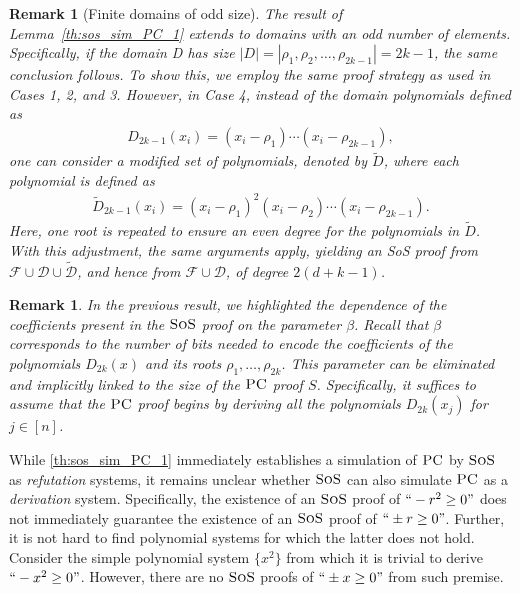 \documentclass[11pt]{article}
\newcommand{\sos}{\text{\sc{SoS}}}
\newcommand{\PC}{\textsc{PC}}
\newcommand{\1}{\textbf{1}}
\newtheorem{remark}[theorem]{Remark}
\begin{document}
\begin{remark}[Finite domains of odd size]
    The result of Lemma~\ref{th:sos_sim_PC_1} extends to domains with an odd number of elements. Specifically, if the domain D has size $|D| = |{\rho_1, \rho_2, \ldots, \rho_{2k - 1}}| = 2k - 1$, the same conclusion follows. To show this, we employ the same proof strategy as used in Cases 1, 2, and 3. However, in Case 4, instead of the domain polynomials defined as
    \begin{align*}
        D_{2k-1}(x_i) = (x_i - \rho_1)\cdots(x_i - \rho_{2k-1}),
    \end{align*}
    one can consider a modified set of polynomials, denoted by $\tilde{D}$, where each polynomial is defined as
    \begin{align*}
        \tilde{D}_{2k-1}(x_i) = (x_i - \rho_1)^2(x_i - \rho_2)\cdots(x_i - \rho_{2k-1}).
    \end{align*}
    Here, one root is repeated to ensure an even degree for the polynomials in $\tilde{D}$. With this adjustment, the same arguments apply, yielding an SoS proof from $\mathcal{F} \cup \mathcal{D} \cup \tilde{\mathcal{D}}$, and hence from $\mathcal{F} \cup \mathcal{D}$, of degree $2(d + k - 1)$.
\end{remark}

\begin{remark}
   In the previous result, we highlighted the dependence of the coefficients present in the $\sos$ proof on the parameter $\beta$. Recall that $\beta$ corresponds to the number of bits needed to encode the coefficients of the polynomials $D_{2k}(x)$ and its roots $\rho_1, \dots, \rho_{2k}$. This parameter can be eliminated and implicitly linked to the size of the $\PC$ proof $S$. Specifically, it suffices to assume that the $\PC$ proof begins by deriving all the polynomials $D_{2k}(x_j)$ for $j \in [n]$.
\end{remark}

While \cref{th:sos_sim_PC_1} immediately establishes a simulation of $\PC$ by $\sos$ as \emph{refutation} systems, it remains unclear whether $\sos$ can also simulate $\PC$ as a \emph{derivation} system. Specifically, the existence of an $\sos$ proof of $``-r^2 \geq 0"$ does not immediately guarantee the existence of an $\sos$ proof of $``\pm r \geq 0"$. Further, it is not hard to find polynomial systems for which the latter does not hold. Consider the simple polynomial system $\{ x^2\}$ from which it is trivial to derive $``-x^2 \geq 0"$. However, there are no $\sos$ proofs of $``\pm x \geq 0"$ from such premise.
\end{document}
